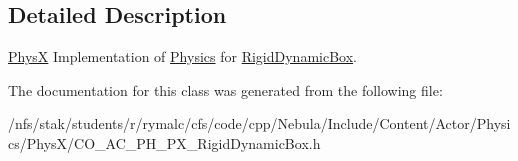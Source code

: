 \subsection{Detailed Description}
\hyperlink{namespaceContent_1_1Actor_1_1Physics_1_1PhysX}{PhysX} Implementation of \hyperlink{namespaceContent_1_1Actor_1_1Physics}{Physics} for \hyperlink{classContent_1_1Actor_1_1Physics_1_1PhysX_1_1RigidDynamicBox}{RigidDynamicBox}. 

The documentation for this class was generated from the following file:\begin{DoxyCompactItemize}
\item 
/nfs/stak/students/r/rymalc/cfs/code/cpp/Nebula/Include/Content/Actor/Physics/PhysX/CO\_\-AC\_\-PH\_\-PX\_\-RigidDynamicBox.h\end{DoxyCompactItemize}
